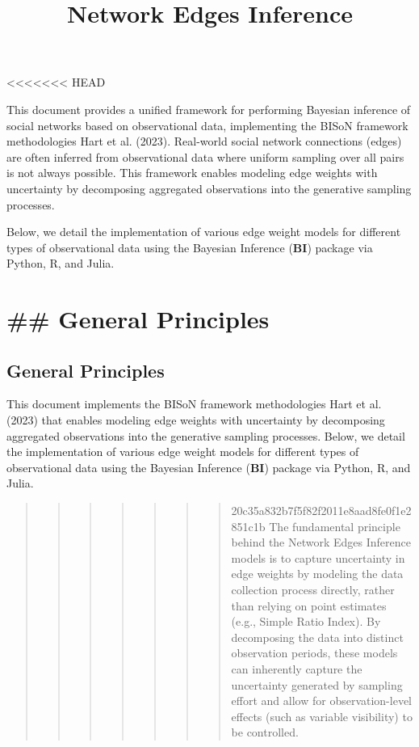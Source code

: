\documentclass[
  letterpaper,
  DIV=11,
  numbers=noendperiod]{scrartcl}
\title{🚧Network Edges Inference🚧}
\author{}
\date{}
\begin{document}
\maketitle


\textless\textless\textless\textless\textless\textless\textless{} HEAD

This document provides a unified framework for performing Bayesian
inference of social networks based on observational data, implementing
the BISoN framework methodologies Hart et al. (2023). Real-world social
network connections (edges) are often inferred from observational data
where uniform sampling over all pairs is not always possible. This
framework enables modeling edge weights with uncertainty by decomposing
aggregated observations into the generative sampling processes.

Below, we detail the implementation of various edge weight models for
different types of observational data using the Bayesian Inference
(\textbf{BI}) package via Python, R, and Julia.

\section{\#\# General Principles}\label{general-principles}

\subsection{General Principles}\label{general-principles-1}

This document implements the BISoN framework methodologies Hart et al.
(2023) that enables modeling edge weights with uncertainty by
decomposing aggregated observations into the generative sampling
processes. Below, we detail the implementation of various edge weight
models for different types of observational data using the Bayesian
Inference (\textbf{BI}) package via Python, R, and Julia.

\begin{quote}
\begin{quote}
\begin{quote}
\begin{quote}
\begin{quote}
\begin{quote}
\begin{quote}
20c35a832b7f5f82f2011e8aad8fe0f1e2851c1b The fundamental principle
behind the Network Edges Inference models is to capture uncertainty in
edge weights by modeling the data collection process directly, rather
than relying on point estimates (e.g., Simple Ratio Index). By
decomposing the data into distinct observation periods, these models can
inherently capture the uncertainty generated by sampling effort and
allow for observation-level effects (such as variable visibility) to be
controlled.
\end{quote}
\end{quote}
\end{quote}
\end{quote}
\end{quote}
\end{quote}
\end{quote}
\end{document}

